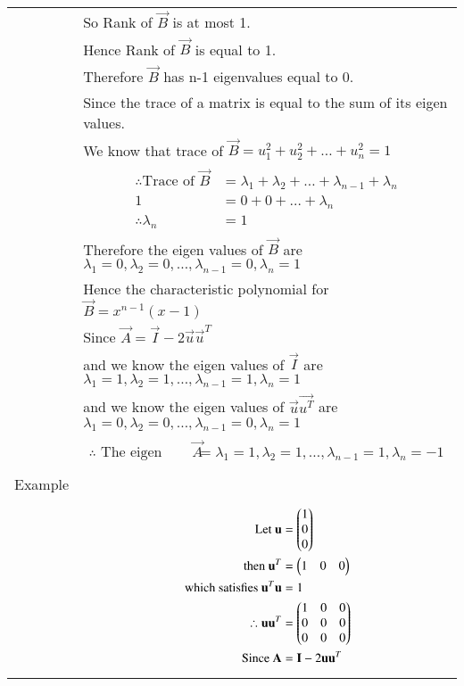 \documentclass[journal,12pt]{IEEEtran}
\begin{document}
\begin{longtable}{|l|l|}
&So Rank of $\vec{B}$ is at most 1.\\
&Hence Rank of $\vec{B}$ is equal to 1.\\
&Therefore $\vec{B}$ has n-1 eigenvalues equal to 0.\\
&Since the trace of a matrix is equal to the sum of its eigen values.\\
&We know that trace of $\vec{B}=u_1^2+u_2^2+\dots+u_n^2=1$\\
&\parbox{10cm}{\begin{align*}
    \therefore\mbox{Trace of }\vec{B}&=\lambda_1+\lambda_2+\dots+\lambda_{n-1}+\lambda_n\\
    1&=0+0+\dots+\lambda_n\\
    \therefore \lambda_n&=1
\end{align*}}\\
&Therefore the eigen values of $\vec{B}$ are $\lambda_1=0,\lambda_2=0,\dots,\lambda_{n-1}=0,\lambda_n=1$\\
&Hence the characteristic polynomial for $\vec{B}=x^{n-1}(x-1)$\\
&Since $\vec{A}=\vec{I}-2\vec{u}\vec{u}^T$\\
&and we know the eigen values of $\vec{I}$ are $\lambda_1=1,\lambda_2=1,\dots,\lambda_{n-1}=1,\lambda_n=1$\\
&and we know the eigen values of $\vec{u}\vec{u^T}$ are $\lambda_1=0,\lambda_2=0,\dots,\lambda_{n-1}=0,\lambda_n=1$\\
&\parbox{14cm}{\begin{align}
 \therefore\mbox{ The eigen values of }\vec{A}&=\lambda_1=1,\lambda_2=1,\dots,\lambda_{n-1}=1,\lambda_n=-1\label{eq:eigen_values_of_general_A}   
\end{align}}\\
\hline
&\\
Example&\\
&\parbox{14cm}{\begin{align}
    \mbox{Let }\vec{u}&=\myvec{1\\0\\0}\\
    \mbox{then }\vec{u}^T&=\myvec{1&0&0}\\
    \mbox{ which satisfies }\vec{u}^T\vec{u}&=1\\
    \therefore \vec{u}\vec{u}^T&=\myvec{1&0&0\\0&0&0\\0&0&0}\\
    \mbox{Since }\vec{A}&=\vec{I}-2\vec{u}\vec{u}^T\\

\end{align}}
\end{longtable}
\end{document}
